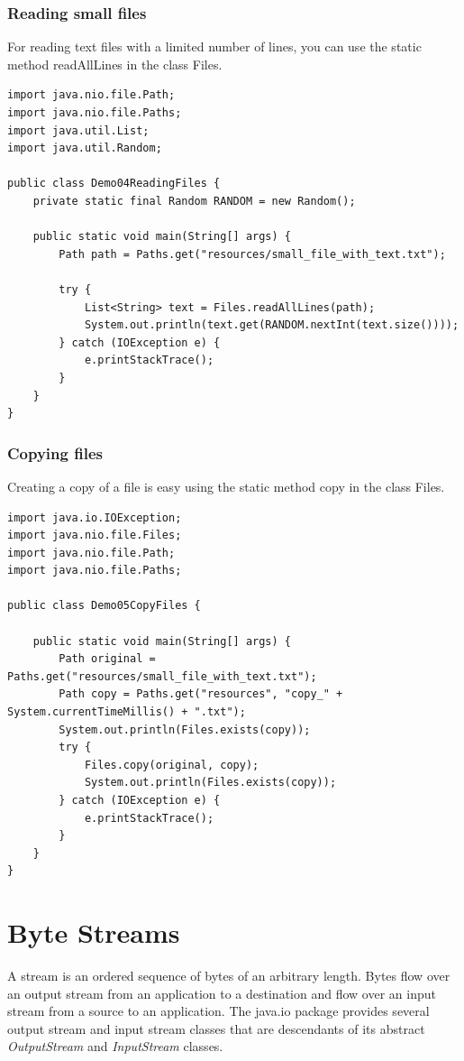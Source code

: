\subsubsection{Reading small files}

For reading text files with a limited number of lines, you can use the static method readAllLines in the class Files.

\begin{lstlisting}
import java.nio.file.Path;
import java.nio.file.Paths;
import java.util.List;
import java.util.Random;

public class Demo04ReadingFiles {
	private static final Random RANDOM = new Random();

	public static void main(String[] args) {
		Path path = Paths.get("resources/small_file_with_text.txt");

		try {
			List<String> text = Files.readAllLines(path);
			System.out.println(text.get(RANDOM.nextInt(text.size())));
		} catch (IOException e) {
			e.printStackTrace();
		}
	}
}
\end{lstlisting}

\subsubsection{Copying files}

Creating a copy of a file is easy using the static method copy in the class Files.

\begin{lstlisting}
import java.io.IOException;
import java.nio.file.Files;
import java.nio.file.Path;
import java.nio.file.Paths;

public class Demo05CopyFiles {

	public static void main(String[] args) {
		Path original = Paths.get("resources/small_file_with_text.txt");
		Path copy = Paths.get("resources", "copy_" + System.currentTimeMillis() + ".txt");
		System.out.println(Files.exists(copy));
		try {
			Files.copy(original, copy);
			System.out.println(Files.exists(copy));
		} catch (IOException e) {
			e.printStackTrace();
		}
	}
}
\end{lstlisting}


\section{Byte Streams}

A stream is an ordered sequence of bytes of an arbitrary length.  Bytes flow over an output stream from an application to a destination and flow over an input stream from a source to an application.
The java.io package provides several output stream and input stream classes that are descendants of its abstract \textit{OutputStream} and \textit{InputStream} classes.


